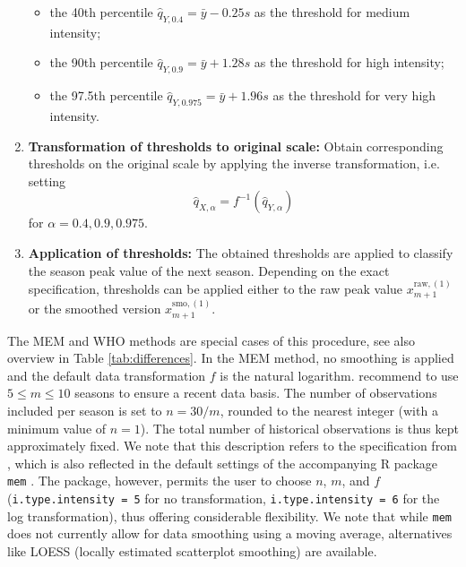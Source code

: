\documentclass{article}
\newcommand{\sd}{s}
\begin{document}
\begin{enumerate}
\begin{itemize}
\item the 40th percentile $\hat{q}_{Y, 0.4} = \bar{y} - 0.25 \sd$ as the threshold for medium intensity;
\item the 90th percentile $\hat{q}_{Y, 0.9} = \bar{y} + 1.28 \sd$ as the threshold for high intensity;
\item the 97.5th percentile $\hat{q}_{Y, 0.975} = \bar{y} + 1.96\sd$ as the threshold for very high intensity.
\end{itemize}
\item \textbf{Transformation of thresholds to original scale:} Obtain corresponding thresholds on the original scale by applying the inverse transformation, i.e. setting %
$$
\hat{q}_{X, \alpha} = f^{-1}(\hat{q}_{Y, \alpha})
$$
for $\alpha = 0.4, 0.9, 0.975$.
\item \textbf{Application of thresholds:} The obtained thresholds are applied to classify the season peak value of the next season. Depending on the exact specification, thresholds can be applied either to the raw peak value $x_{m + 1}^{\text{raw}, (1)}$ or the smoothed version $x_{m + 1}^{\text{smo}, (1)}$.
\end{enumerate}

\noindent The MEM and WHO methods are special cases of this procedure, see also overview in Table \ref{tab:differences}. In the MEM method, no smoothing is applied and the default data transformation $f$ is the natural logarithm.  \cite{Vega2015} recommend to use $5 \leq m \leq 10$ seasons to ensure a recent data basis. The number of observations included per season is set to $n = 30/m$, rounded to the nearest integer (with a minimum value of $n = 1$). The total number of historical observations is thus kept approximately fixed. We note that this description refers to the specification from \cite{Vega2015}, which is also reflected in the default settings of the accompanying R package \texttt{mem} \citep{Lozano2020}. The package, however, permits the user to choose $n$, $m$, and $f$ (\texttt{i.type.intensity	= 5} for no transformation, \texttt{i.type.intensity = 6} for the log transformation), thus offering considerable flexibility. We note that while \texttt{mem} does not currently allow for data smoothing using a moving average, alternatives like LOESS (locally estimated scatterplot smoothing) are available. %
\end{document}
